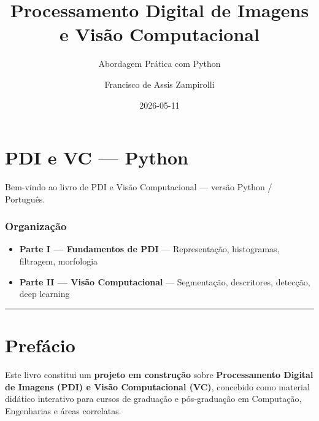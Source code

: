 \documentclass[
  portuguese,
  letterpaper,
  openany,
  oneside,
  12pt,
  a4paper]{book}
\title{Processamento Digital de Imagens e Visão Computacional}
\subtitle{Abordagem Prática com Python}
\author{Francisco de Assis Zampirolli}
\date{2026-05-11}
\providecommand{\tightlist}{%
  \setlength{\itemsep}{0pt}\setlength{\parskip}{0pt}}
\renewcommand*\contentsname{Índice}
\newcommand\contentsname{Índice}
\begin{document}
\frontmatter
\maketitle

\renewcommand*\contentsname{Índice}
{
\hypersetup{linkcolor=}
\setcounter{tocdepth}{2}
\tableofcontents
}

\mainmatter
{}

\chapter*{PDI e VC --- Python}\label{pdi-e-vc-python}


Bem-vindo ao livro de PDI e Visão Computacional --- versão Python /
Português.

\subsection*{Organização}\label{organizauxe7uxe3o}

\begin{itemize}
\tightlist
\item
  \textbf{Parte I --- Fundamentos de PDI} --- Representação,
  histogramas, filtragem, morfologia
\item
  \textbf{Parte II --- Visão Computacional} --- Segmentação,
  descritores, detecção, deep learning
\end{itemize}

\begin{center}\rule{0.5\linewidth}{0.5pt}\end{center}


\chapter*{Prefácio}\label{prefuxe1cio}


Este livro constitui um \textbf{projeto em construção} sobre
\textbf{Processamento Digital de Imagens (PDI) e Visão Computacional
(VC)}, concebido como material didático interativo para cursos de
graduação e pós-graduação em Computação, Engenharias e áreas correlatas.
\end{document}
